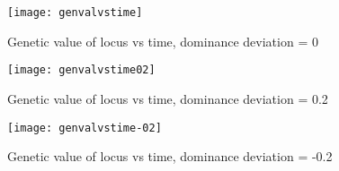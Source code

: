\documentclass[a4paper,10pt]{article}
\begin{document}
\begin{figure}
  \caption{Genetic value of locus vs time, dominance deviation = 0}
  \centering
  \texttt{[image: genvalvstime]}
\end{figure}

\begin{figure}
  \caption{Genetic value of locus vs time, dominance deviation = 0.2}
  \centering
  \texttt{[image: genvalvstime02]}
\end{figure}

\begin{figure}
  \caption{Genetic value of locus vs time, dominance deviation = -0.2}
  \centering
  \texttt{[image: genvalvstime-02]}
\end{figure}
\end{document}
